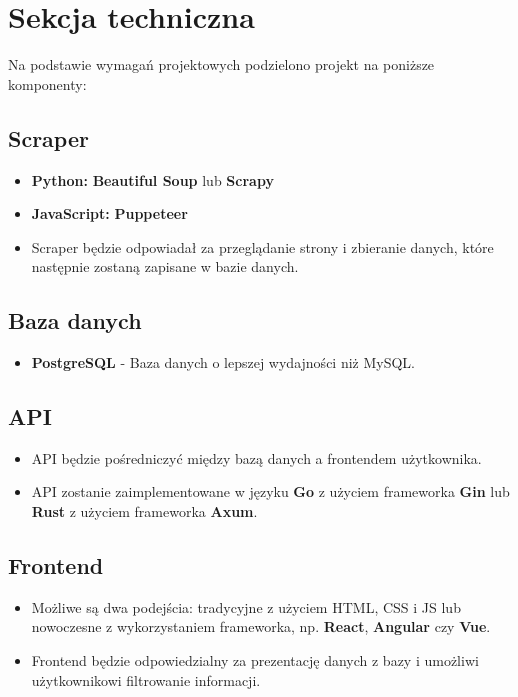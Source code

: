 \documentclass{article}
\begin{document}
\section{Sekcja techniczna}
Na podstawie wymagań projektowych podzielono projekt na poniższe komponenty:

\subsection{Scraper}
\begin{itemize}
  \item \textbf{Python:} \textbf{Beautiful Soup} lub \textbf{Scrapy}
  \item \textbf{JavaScript:} \textbf{Puppeteer}
  \item Scraper będzie odpowiadał za przeglądanie strony i zbieranie danych, które następnie zostaną zapisane w bazie danych.
\end{itemize}

\subsection{Baza danych}
\begin{itemize}
  \item \textbf{PostgreSQL} - Baza danych o lepszej wydajności niż MySQL.
\end{itemize}

\subsection{API}
\begin{itemize}
  \item API będzie pośredniczyć między bazą danych a frontendem użytkownika.
  \item API zostanie zaimplementowane w języku \textbf{Go} z użyciem frameworka \textbf{Gin} lub \textbf{Rust} z użyciem frameworka \textbf{Axum}.
\end{itemize}

\subsection{Frontend}
\begin{itemize}
  \item Możliwe są dwa podejścia: tradycyjne z użyciem HTML, CSS i JS lub nowoczesne z wykorzystaniem frameworka, np. \textbf{React}, \textbf{Angular} czy \textbf{Vue}.
  \item Frontend będzie odpowiedzialny za prezentację danych z bazy i umożliwi użytkownikowi filtrowanie informacji.
\end{itemize}
\end{document}
